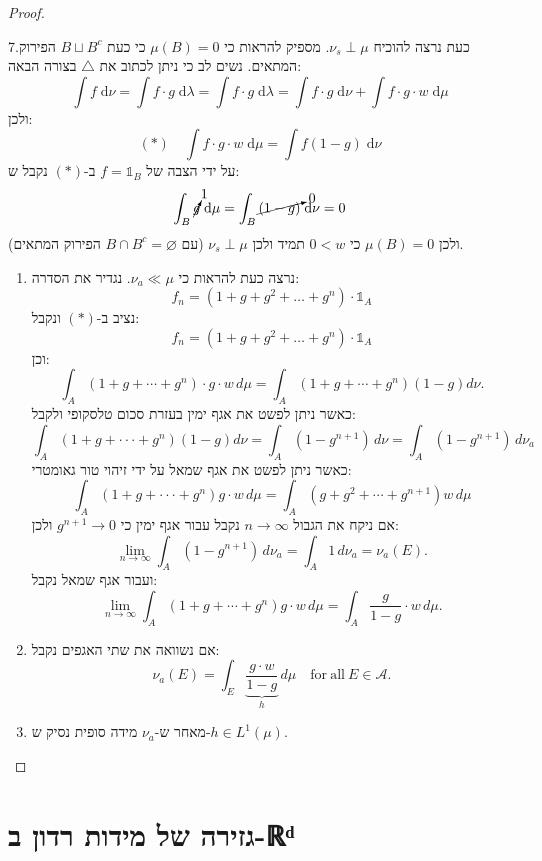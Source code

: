 \documentclass{tstextbook}
\begin{document}
\begin{proof}
\begin{enumerate}
  \end{enumerate}
7.כעת נרצה להוכיח \(\nu_{s}\perp \mu\). מספיק להראות כי \(\mu(B)=0\) כי כעת \(B \sqcup B^{c}\) הפירוק המתאים. נשים לב כי ניתן לכתוב את \(\triangle\) בצורה הבאה: 
$$\int f \;\mathrm{d} \nu =\int f\cdot g \;\mathrm{d} \lambda = \int f\cdot g \;\mathrm{d} \lambda = \int f\cdot g \;\mathrm{d} \nu+\int f\cdot g\cdot w \;\mathrm{d} \mu    $$
ולכן:
$$(*)\quad \int f\cdot g\cdot w \;\mathrm{d} \mu = \int f(1-g) \;\mathrm{d} \nu  $$
על ידי הצבה של \(f=\mathbb{1}_{B}\) ב-\((*)\) נקבל ש:
$$\int_{B} \cancelto{ 1 }{ g } \;\mathrm{d} \mu = \int_{B} \cancelto{ 0 }{ (1-g) } \;\mathrm{d} \nu  =0$$
ולכן \(\mu(B)=0\) כי \(0<w\) תמיד ולכן \(\nu_{s}\perp \mu\) (עם \(B\cap B^{c}=\varnothing\) הפירוק המתאים).

  \begin{enumerate}
    \item נרצה כעת להראות כי \(\nu_{a}\ll \mu\). נגדיר את הסדרה: 
$$f_{n}=\left( 1+g+g^{2}+\dots+ g^{n} \right)\cdot \mathbb{1} _{A}$$
נציב ב-\((*)\) ונקבל:
$$f_{n}=\left( 1+g+g^{2}+\dots+ g^{n} \right)\cdot \mathbb{1} _{A}$$
וכן:
$$\int_{A}\left(1+g+\cdots+g^{n}\right)\cdot g\cdot w\,d\mu=\int_{A}\left(1+g+\cdots+g^{n}\right)\left(1-g\right)d\nu.$$
כאשר ניתן לפשט את אגף ימין בעזרת סכום טלסקופי ולקבל:
$$\int_{A}\left(1+g+\cdot\cdot\cdot+g^{n}\right)\left(1-g\right)d\nu=\int_{A}\left(1-g^{n+1}\right)\,d\nu=\int_{A}\left(1-g^{n+1}\right)\,d\nu_{a}$$
כאשר ניתן לפשט את אגף שמאל על ידי זיהוי טור גאומטרי:
$$\int_{A}\left(1+g+\cdot\cdot\cdot+g^{n}\right)g\cdot w\,d\mu=\int_{A}\left(g+g^{2}+\cdots+g^{n+1}\right)w\,d\mu$$
אם ניקח את הגבול \(n\to \infty\) נקבל עבור אגף ימין כי \(g^{n+1}\to 0\) ולכן:
$$\operatorname*{lim}_{n\to\infty}\int_{A}\left(1-g^{n+1}\right)\,d\nu_{a}=\int_{A}1\,d\nu_{a}=\nu_{a}(E).$$
ועבור אגף שמאל נקבל:
$$\operatorname*{lim}_{n\to\infty}\int_{A}\left(1+g+\cdots+g^{n}\right)g\cdot w\,d\mu=\int_{A}{\frac{g}{1-g}}\cdot w\,d\mu.$$


    \item אם נשוואה את שתי האגפים נקבל: 
$$\nu_{a}(E)=\int_{E}\underbrace{\frac{g\cdot w}{1-g}}_{h}\,d\mu\quad\mathrm{for~all~}E\in\mathcal{A}.$$


    \item מאחר ש-\(\nu_{a}\) מידה סופית נסיק ש-\(h \in L^{1}\left( \mu \right)\). 


  \end{enumerate}
\end{proof}

\section{גזירה של מידות רדון ב-ℝᵈ}
\end{document}
